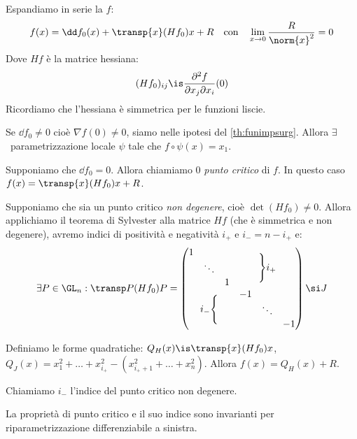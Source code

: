 Espandiamo in serie la $f$:
\[f(x)=
\dd f_{0}(x)+\transp{x}(Hf_{0})x+R
\quad\text{con}\quad
\lim_{x\to0}\frac R{\norm{x}^2}=0\]
Dove $Hf$ è la matrice hessiana:
\[(Hf_{0})_{ij}\is
\frac{\partial^2f}{\partial x_j\partial x_i}(0)\]
Ricordiamo che l'hessiana è simmetrica per le funzioni liscie.

Se $\dd f_{0}\neq0$ cioè $\nabla f(0)\neq0$, siamo nelle ipotesi del \autoref{th:funimpsurg}. Allora $\exists$~parametrizzazione locale $\psi$ tale che $f\circ\psi(x)=x_1$.

Supponiamo che $\dd f_{0}=0$. Allora chiamiamo $0$ \emph{punto critico} di $f$. In questo caso $f(x)=\transp{x}(Hf_{0})x+R$.

Supponiamo che sia un punto critico \emph{non degenere}, cioè $\det(Hf_{0})\neq0$. Allora applichiamo il teorema di Sylvester alla matrice $Hf$ (che è simmetrica e non degenere), avremo indici di positività e negatività $i_+$ e $i_-=n-i_+$ e:
\[\exists P\in\GL_n:
\transp P(Hf_{0})P=
\begin{pmatrix}
	\begin{matrix}
		1 & & \\
		& \ddots & \\
		& & 1 \\
	\end{matrix} & \Bigg\}i_+ \\
	i_-\Bigg\{ & \begin{matrix}
		-1 & & \\
		& \ddots & \\
		& & -1 \\
	\end{matrix}
\end{pmatrix}\si J\]

Definiamo le forme quadratiche: $Q_H(x)\is\transp{x}(Hf_{0})x$, $Q_J(x)=x_1^2+\dots+x_{i_+}^2-(x_{i_++1}^2+\dots+x_n^2)$. Allora $f(x)=Q_H(x)+R$.

Chiamiamo $i_-$ l'indice del punto critico non degenere.

\begin{ex}
	La proprietà di punto critico e il suo indice sono invarianti per riparametrizzazione differenziabile a sinistra.
\end{ex}

